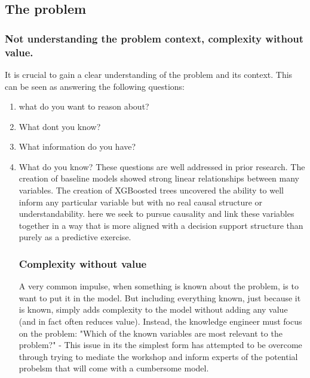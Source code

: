 \subsection{The problem}
\subsubsection{Not understanding the problem context, complexity without value.}
It is crucial to gain a clear understanding of the problem and its context. This can be seen as answering the following questions:
\begin{enumerate}
        \item what do you want to reason about?
        \item What dont you know?
        \item What information do you have?
        \item What do you know?
These questions are well addressed in prior research. The creation of baseline models showed strong linear relationships between many variables. The creation of XGBoosted trees uncovered the ability to well inform any particular variable but with no real causal structure or understandability. here we seek to pursue causality and link these variables together in a way that is more aligned with a decision support structure than purely as a predictive exercise.
\subsubsection{Complexity without value}
A very common impulse, when something is known about the problem, is to want to put it in the model. But including everything known, just because it is known, simply adds complexity to the model without adding any value (and in fact often reduces value). Instead, the knowledge engineer must focus on the problem:
"Which of the known variables are most relevant to the problem?"
- This issue in its the simplest form has attempted to be overcome through trying to mediate the workshop and inform experts of the potential probelsm that will come with a cumbersome model.
\end{enumerate}
